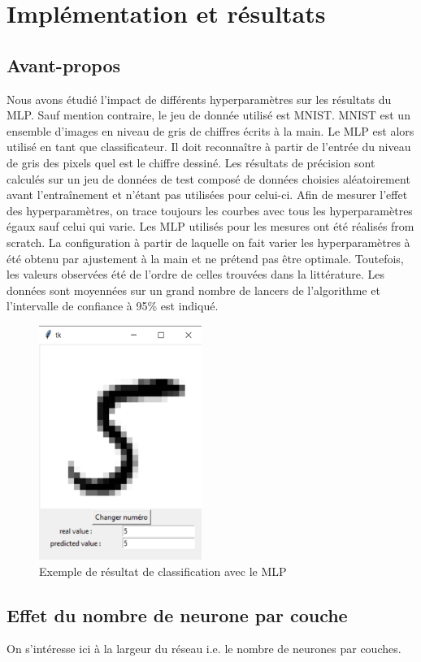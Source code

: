 \section{Implémentation et résultats}
\subsection{Avant-propos}
Nous avons étudié l'impact de différents hyperparamètres sur les résultats du MLP. Sauf mention contraire, le jeu de donnée utilisé est MNIST. MNIST est un ensemble d'images en niveau de gris de chiffres écrits à la main. Le MLP est alors utilisé en tant que classificateur. Il doit reconnaître à partir de l'entrée du niveau de gris des pixels quel est le chiffre dessiné. Les résultats de précision sont calculés sur un jeu de données de test composé de données choisies aléatoirement avant l’entraînement et n'étant pas utilisées pour celui-ci. Afin de mesurer l'effet des hyperparamètres, on trace toujours les courbes avec tous les hyperparamètres égaux sauf celui qui varie.
Les MLP utilisés pour les mesures ont été réalisés from scratch. La configuration à partir de laquelle on fait varier les hyperparamètres à été obtenu par ajustement à la main et ne prétend pas être optimale. Toutefois, les valeurs observées été de l'ordre de celles trouvées dans la littérature. Les données sont moyennées sur un grand nombre de lancers de l'algorithme et l'intervalle de confiance à 95\% est indiqué.

\begin{figure}[!h]
\centering
\includegraphics[width=150pt]{"images/MLP/MNIST_exemple"}
\caption{Exemple de résultat de classification avec le MLP }
\label{MNIST_exemple}
\end{figure}

\subsection{Effet du nombre de neurone par couche}
On s'intéresse ici à la largeur du réseau i.e. le nombre de neurones par couches.

